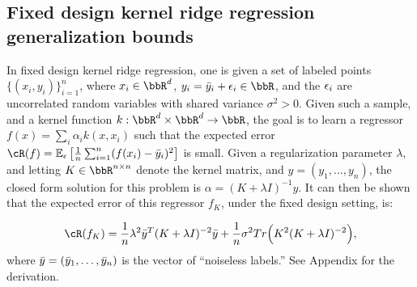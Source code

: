 \subsection{Fixed design kernel ridge regression generalization bounds}
\label{sec:genbound}

In fixed design kernel ridge regression, one is given a set of labeled points $\{(x_i,y_i)\}_{i=1}^n$, where $x_i \in \RR^d$, $y_i = \by_i + \eps_i \in \RR$, and the $\epsilon_i$ are uncorrelated random variables with shared variance $\sigma^2 > 0$. Given such a sample, and a kernel function $k:\RR^d\times\RR^d\rightarrow \RR$, the goal is to learn a regressor $f(x) = \sum_i \alpha_i k(x,x_i)$ such that the expected error $\cR(f) = \expect{\eps}{\frac{1}{n}\sum_{i=1}^n (f(x_i) - \by_i)^2}$ is small. Given a regularization parameter $\lambda$, and letting $K\in\RR^{n\times n}$ denote the kernel matrix, and $y = (y_1,\ldots,y_n)$, the closed form solution for this problem is $\alpha = (K+\lambda I)^{-1}y$. It can then be shown that the expected error of this regressor $f_K$, under the fixed design setting, is:

\begin{eqnarray}
\cR(f_K) = \frac{1}{n}\lambda^2 \by^T(K+\lambda I)^{-2}\by + \frac{1}{n}\sigma^2 Tr\Big(K^2(K+\lambda \id)^{-2}\Big),
\end{eqnarray}
where $\bar{y} = (\bar{y}_1,\ldots,\bar{y}_n)$ is the vector of ``noiseless labels.'' See Appendix  for the derivation.

